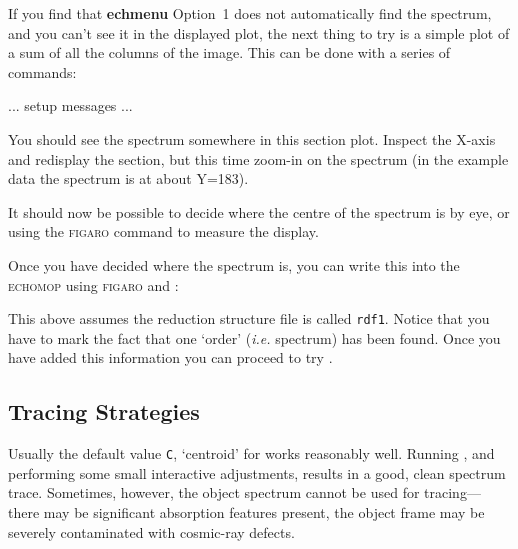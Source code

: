 \documentclass[twoside,11pt]{starlink}
\providecommand{\mlabel}[1]{\xlabel{#1}\label{#1}}
\providecommand{\scspec}[2]{#1}
\begin{document}
If you find that \textbf{echmenu} Option~1 does not automatically find the
spectrum, and you can't see it in the displayed plot, the next thing to
try is a simple plot of a sum of all the columns of the image.  This can
be done with a series of  commands:

{
\scspec{\small}{ }
\begin{terminalv}
   ... setup messages ...
\end{terminalv}
}

You should see the spectrum somewhere in this section plot.  Inspect the
X-axis and redisplay the section, but this time zoom-in on the spectrum
(in the example data the spectrum is at about Y=183).

{
\scspec{\small}{ }
\begin{terminalv}
\end{terminalv}
}

It should now be possible to decide where the centre of the spectrum is
by eye, or using the \textsc{figaro} command 
to measure the display.

Once you have decided where the spectrum is, you can write this into the
\textsc{echomop}
 using \textsc{figaro}
 and
:

{
\scspec{\small}{ }
\begin{terminalv}
\end{terminalv}
}

This above assumes the reduction structure file is called \verb+rdf1+\@.
Notice that you have to mark the fact that one `order' ({\it{i.e.}} spectrum)
has been found.  Once you have added this information you can proceed to
try \@.


\subsection{\mlabel{cook_tracing}Tracing Strategies}

Usually the default value \texttt{C}, `centroid' for
 works reasonably
well. Running  , and performing some small
interactive adjustments, results in a good, clean spectrum trace.
Sometimes, however, the object spectrum cannot be used for
tracing\scspec{---}{ - }there may be significant absorption features
present, the object frame may be severely contaminated with cosmic-ray
defects.
\end{document}
